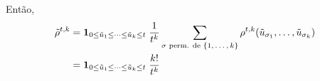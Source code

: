 \begin{topics}
Então,
\begin{equation}
  \begin{split}
    \tilde{\rho}^{t, k} & = {\bf 1}_{0 \leq \tilde{u}_1 \leq \dots \leq \tilde{u}_k \leq t} \; \frac{1}{t^k} \sum_{\sigma \text{ perm. de $\{1, \dots, k\}$}} \rho^{t, k}(\tilde{u}_{\sigma_1}, \dots, \tilde{u}_{\sigma_k}) \\
    & = {\bf 1}_{0 \leq \tilde{u}_1 \leq \dots \leq \tilde{u}_k \leq t} \; \frac{k!}{t^k} 
  \end{split}
\end{equation}

\end{topics}



